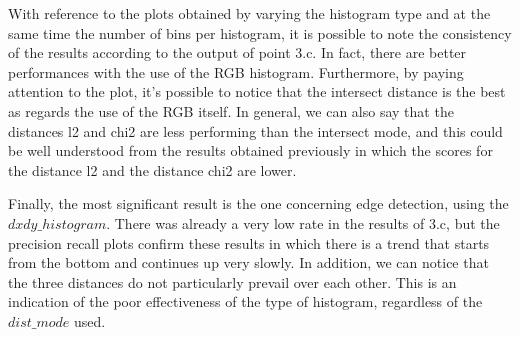 \documentclass{article}
\begin{document}
With reference to the plots obtained by varying the histogram type and at the same time the number of bins per histogram, it is possible to note the consistency of the results according to the output of point 3.c.
In fact, there are better performances with the use of the RGB histogram. Furthermore, by paying attention to the plot, it’s possible to notice that the intersect distance is the best as regards the use of the RGB itself.
In general, we can also say that the distances l2 and chi2 are less performing than the intersect mode, and this could be well understood from the results obtained previously in which the scores for the distance l2 and the distance chi2 are lower.

Finally, the most significant result is the one  concerning edge detection, using the $dxdy\_ histogram$.
There was already a very low rate in the results of 3.c, but the precision recall plots  confirm these results in which there is a trend that starts from the bottom and continues up very slowly. In addition, we can notice that the three distances do not particularly prevail over each other. This is an indication of the poor effectiveness of the type of histogram, regardless of the $dist\_ mode$ used.

 
\end{document}
